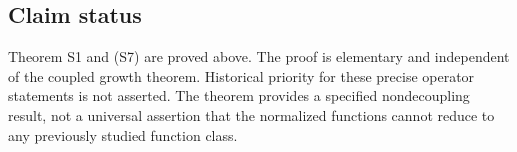 \hypertarget{v11-coupled_structure_full-claim-status}{%
\subsection{Claim status}\label{v11-coupled_structure_full-claim-status}}

Theorem S1 and (S7) are proved above. The proof is elementary and
independent of the coupled growth theorem. Historical priority for these
precise operator statements is not asserted. The theorem provides a
specified nondecoupling result, not a universal assertion that the
normalized functions cannot reduce to any previously studied function
class.
